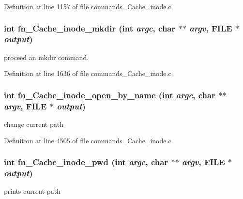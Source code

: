 Definition at line 1157 of file commands\_\-Cache\_\-inode.c.
\subsubsection[{fn\_\-Cache\_\-inode\_\-mkdir}]{\setlength{\rightskip}{0pt plus 5cm}int fn\_\-Cache\_\-inode\_\-mkdir (int {\em argc}, \/  char $\ast$$\ast$ {\em argv}, \/  FILE $\ast$ {\em output})}\label{commands__Cache__inode_8c_9230f34cda91d77f51bb32b5acf2b4ae}


proceed an mkdir command. 

Definition at line 1636 of file commands\_\-Cache\_\-inode.c.
\subsubsection[{fn\_\-Cache\_\-inode\_\-open\_\-by\_\-name}]{\setlength{\rightskip}{0pt plus 5cm}int fn\_\-Cache\_\-inode\_\-open\_\-by\_\-name (int {\em argc}, \/  char $\ast$$\ast$ {\em argv}, \/  FILE $\ast$ {\em output})}\label{commands__Cache__inode_8c_645198e6ac2e4e29a4df46b005b1c6eb}


change current path 

Definition at line 4505 of file commands\_\-Cache\_\-inode.c.
\subsubsection[{fn\_\-Cache\_\-inode\_\-pwd}]{\setlength{\rightskip}{0pt plus 5cm}int fn\_\-Cache\_\-inode\_\-pwd (int {\em argc}, \/  char $\ast$$\ast$ {\em argv}, \/  FILE $\ast$ {\em output})}\label{commands__Cache__inode_8c_aeb47365ab7e7c924c2a6caf763e818f}


prints current path 

